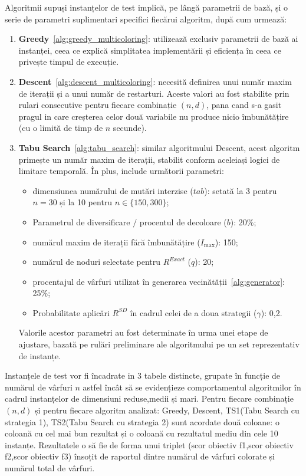 Algoritmii supuși instanțelor de test implică, pe lângă parametrii de bază, și o serie de parametri suplimentari specifici fiecărui algoritm, după cum urmează:
\begin{enumerate}
  \item \textbf{Greedy}~\ref{alg:greedy_multicoloring}: utilizează exclusiv parametrii de bază ai instanței, ceea ce explică simplitatea implementării și eficiența în ceea ce privește timpul de execuție.

  \item \textbf{Descent}~\ref{alg:descent_multicoloring}: necesită definirea unui număr maxim de iterații și a unui număr de restarturi. Aceste valori au fost stabilite prin rulari consecutive pentru fiecare combinație $(n,d)$, pana cand s-a gasit pragul in care creșterea celor două variabile nu produce nicio îmbunătățire (cu o limită de timp de $n$ secunde).
  \item \textbf{Tabu Search}~\ref{alg:tabu_search}: similar algoritmului Descent, acest algoritm primește un număr maxim de iterații, stabilit conform aceleiași logici de limitare temporală. În plus, include următorii parametri:
  \begin{itemize}
    \item dimensiunea numărului de mutări interzise ($tab$): setată la 3 pentru $n = 30$ și la 10 pentru $n \in \{150, 300\}$;
    \item Parametrul de diversificare $/$ procentul de decoloare ($b$): 20\%;
    \item numărul maxim de iterații fără îmbunătățire ($I_{\max}$): 150;
    \item numărul de noduri selectate pentru $R^{Exact}$ ($q$): 20;
    \item procentajul de vârfuri utilizat în generarea vecinătății~\ref{alg:generator}: 25\%;
    \item Probabilitate aplicări $R^{SD}$ în cadrul celei de a doua strategii ($\gamma$): 0{,}2.
  \end{itemize}
  Valorile acestor parametri au fost determinate în urma unei etape de ajustare, bazată pe rulări preliminare ale algoritmului pe un set reprezentativ de instanțe.
\end{enumerate}


Instanțele de test vor fi încadrate in 3 tabele distincte, grupate în funcție de  numărul de vârfuri $n$ astfel încât să se evidențieze comportamentul algoritmilor în cadrul instanțelor de dimensiuni reduse,medii și mari. Pentru fiecare combinație $(n,d)$ și pentru fiecare algoritm analizat: Greedy, Descent, TS1(Tabu Search cu strategia 1), TS2(Tabu Search cu strategia 2) sunt acordate două coloane: o coloană cu cel mai bun rezultat și o coloană cu rezultatul mediu din cele 10 instanțe. Rezultatele o să fie de forma unui triplet (scor obiectiv f1,scor obiectiv f2,scor obiectiv f3) însoțit de raportul dintre numărul de vârfuri colorate și numărul total de vârfuri.


